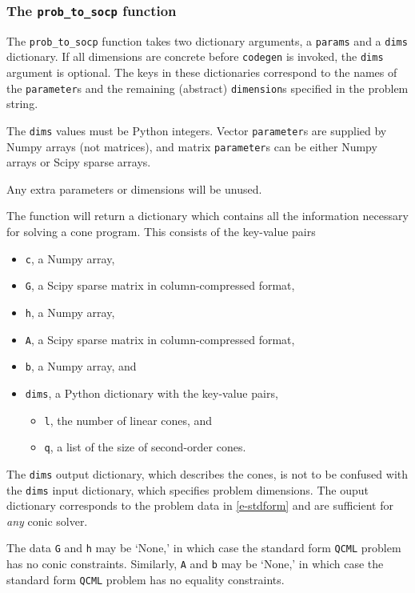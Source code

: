 \documentclass[11pt]{article}
\def\qcml{\texttt{QCML}\xspace}
\begin{document}
\subsubsection{The {\tt prob\_to\_socp} function}
The {\tt prob\_to\_socp} function takes two dictionary
arguments, a {\tt params} and a {\tt dims} dictionary. If all dimensions are
concrete before {\tt codegen} is invoked, the {\tt dims} argument is optional.
The keys in these
dictionaries correspond to the names of the {\tt parameter}s and the 
remaining (abstract)
{\tt dimension}s specified in the problem string.

The {\tt dims} values must be Python integers. Vector {\tt parameter}s are
supplied by Numpy arrays (not matrices), and matrix {\tt parameter}s can be
either Numpy arrays or Scipy sparse arrays.

Any extra parameters or dimensions will be unused. 

The function will return a dictionary which contains all the information
necessary for solving a cone program. This consists of the key-value pairs
\begin{itemize}
  \item {\tt c}, a Numpy array,
  \item {\tt G}, a Scipy sparse matrix in column-compressed format,
  \item {\tt h}, a Numpy array,
  \item {\tt A}, a Scipy sparse matrix in column-compressed format,
  \item {\tt b}, a Numpy array, and
  \item {\tt dims}, a Python dictionary with the key-value pairs,
  \begin{itemize}
    \item {\tt l}, the number of linear cones, and
    \item {\tt q}, a list of the size of second-order cones.
  \end{itemize}
\end{itemize}
The {\tt dims} output dictionary, which describes the cones, 
is not to be confused with the {\tt dims} input 
dictionary, which specifies problem dimensions. 
The ouput dictionary corresponds to the problem data in \eqref{e-stdform}
and are sufficient for \emph{any} conic solver.

The data {\tt G} and {\tt h} may be `None,' in which case the standard form
\qcml problem has no conic constraints. Similarly, {\tt A} and {\tt b} may be
`None,' in which case the standard form \qcml problem has no equality
constraints.
\end{document}
